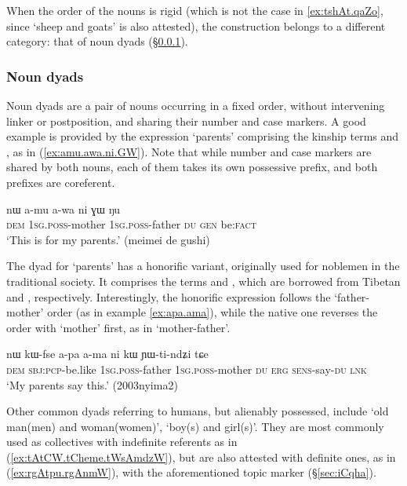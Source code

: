 When the order of the nouns is rigid (which is not the case in \ref{ex:tshAt.qaZo}, since  `sheep and goats' is also attested), the construction belongs to a different category: that of noun dyads (§\ref{sec:dyads}).

\subsubsection{Noun dyads} \label{sec:dyads}
Noun dyads are a pair of nouns occurring in a fixed order, without intervening linker or postposition, and sharing their number and case markers. A good example is provided by the expression `parents' comprising the kinship terms  and , as in (\ref{ex:amu.awa.ni.GW}). Note that while number and case markers are shared by both nouns, each of them takes its own possessive prefix, and both prefixes are coreferent. 

\begin{exe}
\ex \label{ex:amu.awa.ni.GW}
 \gll nɯ a-mu a-wa ni ɣɯ ŋu \\
 \textsc{dem}  \textsc{1sg}.\textsc{poss}-mother \textsc{1sg}.\textsc{poss}-father \textsc{du} \textsc{gen} be:\textsc{fact} \\
 \glt `This is for my parents.' (meimei de gushi)
\end{exe}

The dyad for `parents' has a honorific variant, originally used for noblemen in the traditional society. It comprises the terms  and , which are borrowed from Tibetan   and , respectively. Interestingly, the honorific expression follows the `father-mother' order (as in example \ref{ex:apa.ama}), while the native one reverses the order with `mother' first, as in `mother-father'. 

\begin{exe}
\ex \label{ex:apa.ama}
 \gll nɯ kɯ-fse a-pa a-ma ni kɯ ɲɯ-ti-ndʑi tɕe \\
 \textsc{dem} \textsc{sbj}:\textsc{pcp}-be.like \textsc{1sg}.\textsc{poss}-father  \textsc{1sg}.\textsc{poss}-mother \textsc{du} \textsc{erg} \textsc{sens}-say-\textsc{du} \textsc{lnk} \\
 \glt `My parents say this.' (2003nyima2)
\end{exe}

Other common dyads referring to humans, but alienably possessed, include  `old man(men) and woman(women)',  `boy(s) and girl(s)'. They are most commonly used as collectives with indefinite referents as in (\ref{ex:tAtCW.tCheme.tWsAmdzW}), but are also attested with definite ones, as in (\ref{ex:rgAtpu.rgAnmW}), with the aforementioned topic marker  (§\ref{sec:iCqha}).
 

